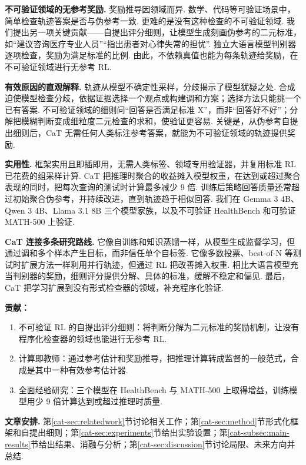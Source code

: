 \textbf{不可验证领域的无参考奖励.} 奖励推导因领域而异. 数学、代码等可验证场景中，简单检查轨迹答案是否与伪参考一致. 更难的是没有这种检查的不可验证领域. 我们提出另一项关键贡献——自提出评分细则，让模型生成刻画伪参考的二元标准，如“建议咨询医疗专业人员”“指出患者对心律失常的担忧”. 独立大语言模型判别器逐项检查，奖励为满足标准的比例. 由此，不依赖真值也能为每条轨迹给奖励，在不可验证领域进行无参考 RL.

\textbf{有效原因的直观解释.} 轨迹从模型不确定性采样，分歧揭示了模型犹疑之处. 合成迫使模型检查分歧，依据证据选择一个观点或构建调和方案；选择方法只能挑一个已有答案. 不可验证领域的细则问“回答是否满足标准 X”，而非“回答好不好”；分解把模糊判断变成细粒度二元检查的求和，使验证更容易. 关键是，从伪参考自提出细则后，CaT 无需任何人类标注参考答案，就能为不可验证领域的轨迹提供奖励.

\textbf{实用性.} 框架实用且即插即用，无需人类标签、领域专用验证器，并复用标准 RL 已花费的组采样计算. CaT 把推理时聚合的收益摊入模型权重，在达到或超过聚合表现的同时，把每次查询的测试时计算最多减少 9 倍. 训练后策略回答质量还常超过初始聚合伪参考，并持续改进，直到轨迹趋于相似回答. 我们在 Gemma 3 4B、Qwen 3 4B、Llama 3.1 8B 三个模型家族，以及不可验证 HealthBench 和可验证 MATH-500 上验证.

\textbf{CaT 连接多条研究路线.} 它像自训练\cite{cat-schmidhuber2003exploring,cat-schmidhuber2013powerplay,cat-silver2016mastering,cat-silver2018general}和知识蒸馏\cite{cat-hinton2015distilling}一样，从模型生成监督学习，但通过调和多个样本产生目标，而非信任单个自标签. 它像多数投票、best-of-N 等测试时扩展方法一样利用并行轨迹，但通过 RL 把改善摊入权重. 相比大语言模型充当判别器的奖励\cite{cat-zheng2023judging}，细则评分提供分解、具体的标准，缓解不稳定和偏见\cite{cat-dineen2025qa,cat-gunjal2025rubrics}. 最后，CaT 把学习扩展到没有形式检查器的领域，补充程序化验证\cite{cat-lambert2024tulu}.

\textbf{贡献：}
\begin{enumerate}
\item 不可验证 RL 的自提出评分细则：将判断分解为二元标准的奖励机制，让没有程序化检查器的领域也能进行无参考 RL.
\item 计算即教师：通过参考估计和奖励推导，把推理计算转成监督的一般范式，合成是其中一种有效参考估计器.
\item 全面经验研究：三个模型在 HealthBench 与 MATH-500 上取得增益，训练模型用少 9 倍计算达到或超过推理时质量.
\end{enumerate}
\textbf{文章安排.} 第\ref{cat-sec:relatedwork}节讨论相关工作；第\ref{cat-sec:method}节形式化框架和自提出细则；第\ref{cat-sec:experiments}节给出实验设置；第\ref{cat-subsec:main-results}节给出结果、消融与分析；第\ref{cat-sec:discussion}节讨论局限、未来方向并总结.

